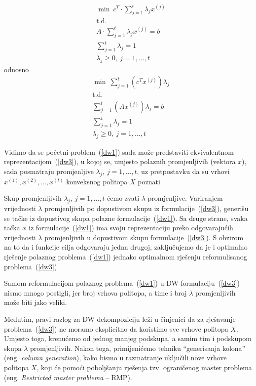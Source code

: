 \documentclass[a4paper, utf8, 11pt, colorlinks]{book}
\theoremstyle{definition}
\begin{document}
 
   \begin{equation}
 	\begin{aligned}\label{dw2}
 	&	\min\  c^T\cdot \sum_{j=1}^t\lambda_jx^{(j)}\\
 		&\mbox{t.d.}\\  
 		&A\cdot \sum_{j=1}^t\lambda_jx^{(j)}=b\\
 		 		 &\sum_{j=1}^t\lambda_j = 1\\
 		&\lambda_j\geqslant 0,\ j = 1,\ldots,t
 	\end{aligned}
 \end{equation}
odnosno
    \begin{equation}
 	\begin{aligned}\label{dw3}
 		&\min\  \sum_{j=1}^t(c^T x^{(j)})\lambda_j\\
 			&\mbox{t.d.}\\   
 		&\sum_{j=1}^t (A x^{(j)})\lambda_j=b\\
 		&\sum_{j=1}^t\lambda_j = 1\\
 		&\lambda_j\geqslant 0,\ j = 1,\ldots,t
 	\end{aligned}
 \end{equation}
 
 Vidimo da se početni problem~(\ref{dw1}) sada može predstaviti ekvivalentnom reprezentacijom~(\ref{dw3}), u kojoj se, umjesto polaznih promjenljivih (vektora $x$), sada posmatraju promjenljive $\lambda_j,\ j = 1,\ldots,t$, uz pretpostavku da su  vrhovi $x^{(1)},x^{(2)},\dots,x^{(t)}$ konveksnog politopa $X$ poznati.
 
 Skup promjenljivih $\lambda_j,\ j = 1,\ldots,t$ ćemo zvati $\lambda$ promjenljive.
  Variranjem vrijednosti $\lambda$ promjenljivih po dopustivom skupu iz formulacije~(\ref{dw3}), generišu se tačke iz dopustivog skupa polazne formulacije~(\ref{dw1}). Sa druge strane, svaka tačka $x$ iz formulacije~(\ref{dw1}) ima svoju reprezentaciju preko odgovarajućih vrijednosti  $\lambda$ promjenljivih u dopustivom skupu formulacije~(\ref{dw3}). S obzirom na to da i funkcije cilja odgovaraju jedna drugoj, zaključujemo da je i optimalno rješenje polaznog problema~(\ref{dw1}) jednako optimalnom rješenju reformulisanog problema~(\ref{dw3}).
 
 Samom reformulacijom polaznog problema~(\ref{dw1}) u DW formulaciju~(\ref{dw3}) nismo mnogo postigli, jer broj vrhova politopa, a time i broj $\lambda$ promjenljivih može biti jako veliki.
 
 Međutim, pravi razlog za DW dekompoziciju leži u činjenici da za rješavanje problema~(\ref{dw3}) ne moramo eksplicitno da koristimo sve vrhove politopa $X$. Umjesto toga, krenućemo od jednog   manjeg podskupa, a samim tim i podskupom skupa $\lambda$ promjenljivih. Nakon toga, primijenićemo tehniku ``generisanja kolona'' (eng. \emph{column generation}), kako bismo u razmatranje uključili nove vrhove politopa $X$, koji će pomoći poboljšanju rješenja tzv. ograničenog master problema (eng. \emph{Restricted master problema} -- RMP).
 
\end{document}
